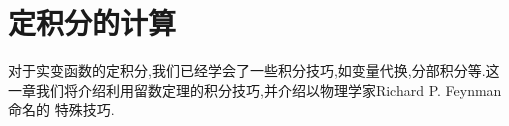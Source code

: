 \chapter{定积分的计算}
对于实变函数的定积分,我们已经学会了一些积分技巧,如变量代换,分部积分等.这一章我们将介绍利用留数定理的积分技巧,并介绍以物理学家Richard P. Feynman命名的
特殊技巧.




% 